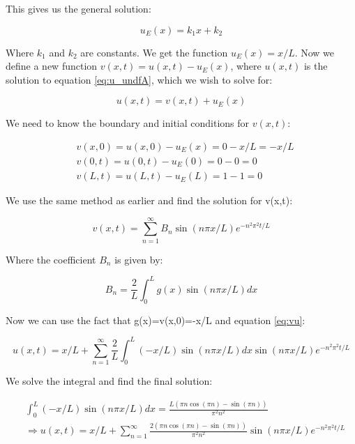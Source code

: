 \documentclass{article}
\begin{document}
This gives us the general solution:

\begin{equation*}
u_E(x)=k_1x + k_2
\end{equation*}

Where $k_1$ and $k_2$ are constants. We get the function $u_E(x)=x/L$. Now we define a new function $v(x,t)=u(x,t)-u_E(x)$, where $u(x,t)$ is the solution to equation \ref{eq:u_undfA}, which we wish to solve for:

\begin{equation}
u(x,t)=v(x,t)+u_E(x)
\label{eq:vu}
\end{equation}

We need to know the boundary and initial conditions for $v(x,t)$:

\begin{equation*}
\begin{split}
&v(x,0)=u(x,0)-u_E(x)=0-x/L=-x/L\\
&v(0,t)=u(0,t)-u_E(0)=0-0=0\\
&v(L,t)=u(L,t)-u_E(L)=1-1=0
\end{split}
\end{equation*}
 
 We use the same method as earlier and find the solution for v(x,t):
 
 \begin{equation}
v(x,t) = \sum_{n=1}^{\infty}B_n\sin{(n\pi x/L)}e^{-n^2\pi^2t/L}
\end{equation}
 
Where the coefficient $B_n$ is given by:

\begin{equation}
B_n=\frac{2}{L}\int_0^Lg(x)\sin{(n\pi x/L)} dx
\end{equation}

Now we can use the fact that g(x)=v(x,0)=-x/L and equation \ref{eq:vu}:

\begin{equation}
u(x,t)=x/L+\sum_{n=1}^{\infty}\frac{2}{L}\int_0^L(-x/L)\sin{(n\pi x/L)} dx\sin{(n\pi x/L)}e^{-n^2\pi^2t/L}
\end{equation}

We solve the integral and find the final solution:

\begin{equation*}
\begin{split}
&\int_0^L(-x/L)\sin{(n\pi x/L)} dx=\frac{L(\pi n \cos{(\pi n)}-\sin{(\pi n)})}{\pi^2n^2}\\
&\Rightarrow u(x,t)=x/L+\sum_{n=1}^{\infty}\frac{2(\pi n \cos{(\pi n)}-\sin{(\pi n)})}{\pi^2n^2}\sin{(n\pi x/L)}e^{-n^2\pi^2t/L}
\end{split}
\end{equation*}
\end{document}
